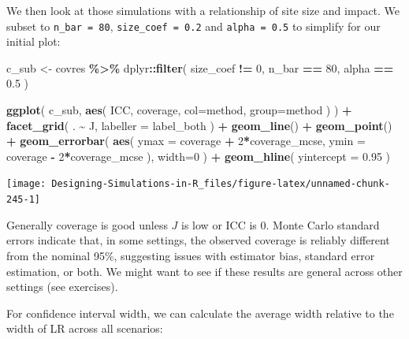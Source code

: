 \documentclass[
]{book}
\newenvironment{Shaded}{\begin{snugshade}}{\end{snugshade}}
\newcommand{\AttributeTok}[1]{\textcolor[rgb]{0.13,0.29,0.53}{#1}}
\newcommand{\DecValTok}[1]{\textcolor[rgb]{0.00,0.00,0.81}{#1}}
\newcommand{\FloatTok}[1]{\textcolor[rgb]{0.00,0.00,0.81}{#1}}
\newcommand{\FunctionTok}[1]{\textcolor[rgb]{0.13,0.29,0.53}{\textbf{#1}}}
\newcommand{\NormalTok}[1]{#1}
\newcommand{\OtherTok}[1]{\textcolor[rgb]{0.56,0.35,0.01}{#1}}
\newcommand{\SpecialCharTok}[1]{\textcolor[rgb]{0.81,0.36,0.00}{\textbf{#1}}}
\begin{document}
We then look at those simulations with a relationship of site size and impact.
We subset to \texttt{n\_bar\ =\ 80}, \texttt{size\_coef\ =\ 0.2} and \texttt{alpha\ =\ 0.5} to simplify for our initial plot:

\begin{Shaded}
\begin{Highlighting}[]
\NormalTok{c\_sub }\OtherTok{\textless{}{-}}\NormalTok{ covres }\SpecialCharTok{\%\textgreater{}\%}
\NormalTok{  dplyr}\SpecialCharTok{::}\FunctionTok{filter}\NormalTok{( size\_coef }\SpecialCharTok{!=} \DecValTok{0}\NormalTok{, n\_bar }\SpecialCharTok{==} \DecValTok{80}\NormalTok{, alpha }\SpecialCharTok{==} \FloatTok{0.5}\NormalTok{ )}

\FunctionTok{ggplot}\NormalTok{( c\_sub, }\FunctionTok{aes}\NormalTok{( ICC, coverage, }\AttributeTok{col=}\NormalTok{method, }\AttributeTok{group=}\NormalTok{method ) ) }\SpecialCharTok{+}
  \FunctionTok{facet\_grid}\NormalTok{( . }\SpecialCharTok{\textasciitilde{}}\NormalTok{ J, }\AttributeTok{labeller =}\NormalTok{ label\_both ) }\SpecialCharTok{+}
  \FunctionTok{geom\_line}\NormalTok{() }\SpecialCharTok{+}
  \FunctionTok{geom\_point}\NormalTok{() }\SpecialCharTok{+}
  \FunctionTok{geom\_errorbar}\NormalTok{( }\FunctionTok{aes}\NormalTok{( }\AttributeTok{ymax =}\NormalTok{ coverage }\SpecialCharTok{+} \DecValTok{2}\SpecialCharTok{*}\NormalTok{coverage\_mcse, }
                      \AttributeTok{ymin =}\NormalTok{ coverage }\SpecialCharTok{{-}} \DecValTok{2}\SpecialCharTok{*}\NormalTok{coverage\_mcse ), }\AttributeTok{width=}\DecValTok{0}\NormalTok{ ) }\SpecialCharTok{+}
  \FunctionTok{geom\_hline}\NormalTok{( }\AttributeTok{yintercept =} \FloatTok{0.95}\NormalTok{ )}
\end{Highlighting}
\end{Shaded}

\begin{center}\texttt{[image: Designing-Simulations-in-R\_files/figure-latex/unnamed-chunk-245-1]} \end{center}

Generally coverage is good unless \(J\) is low or ICC is 0.
Monte Carlo standard errors indicate that, in some settings, the observed coverage is reliably different from the nominal 95\%, suggesting issues with estimator bias, standard error estimation, or both.
We might want to see if these results are general across other settings (see exercises).

For confidence interval width, we can calculate the average width relative to the width of LR across all scenarios:
\end{document}
